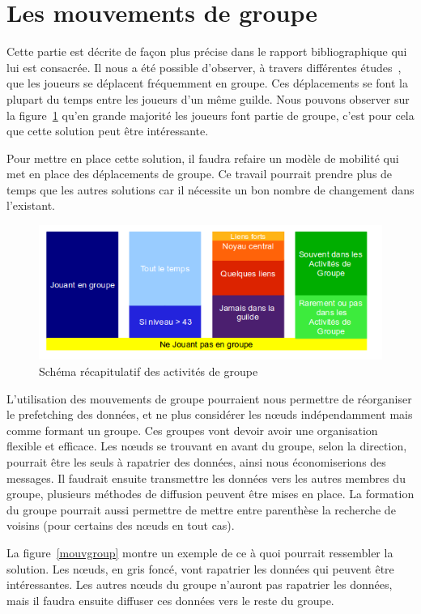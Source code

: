 \documentclass[11pt,a4paper]{article}
\begin{document}
\newpage
\section{Les mouvements de groupe}
Cette partie est décrite de façon plus précise dans le rapport bibliographique qui lui est consacrée. Il nous a été possible d'observer, à travers différentes études~\cite{1124834,1124834,1031667}, que les joueurs se déplacent fréquemment en groupe. Ces déplacements se font la plupart du temps entre les joueurs d'un même guilde. Nous pouvons observer sur la figure~\ref{recapstat} qu'en grande majorité les joueurs font partie de groupe, c'est pour cela que cette solution peut être intéressante. 
\par Pour mettre en place cette solution, il faudra refaire un modèle de mobilité qui met en place des déplacements de groupe. Ce travail pourrait prendre plus de temps que les autres solutions car il nécessite un bon nombre de changement dans l'existant.

	\vspace{1cm}
        \begin{figure}[!h]
        \centering
        \includegraphics[scale=0.65]{./images/recapstat.png}
        \caption{Schéma récapitulatif des activités de groupe}
        \label{recapstat}
        \end{figure}

\par L'utilisation des mouvements de groupe pourraient nous permettre de réorganiser le prefetching des données, et ne plus considérer les nœuds indépendamment mais comme formant un groupe. Ces groupes vont devoir avoir une organisation flexible et efficace. Les nœuds se trouvant en avant du groupe, selon la direction, pourrait être les seuls à rapatrier des données, ainsi nous économiserions des messages. Il faudrait ensuite transmettre les données vers les autres membres du groupe, plusieurs méthodes de diffusion peuvent être mises en place. La formation du groupe pourrait aussi permettre de mettre entre parenthèse la recherche de voisins (pour certains des nœuds en tout cas). 
\par La figure~\ref{mouvgroup} montre un exemple de ce à quoi pourrait ressembler la solution. Les nœuds, en gris foncé, vont rapatrier les données qui peuvent être intéressantes. Les autres nœuds du groupe n'auront pas rapatrier les données, mais il faudra ensuite diffuser ces données vers le reste du groupe.
\end{document}
